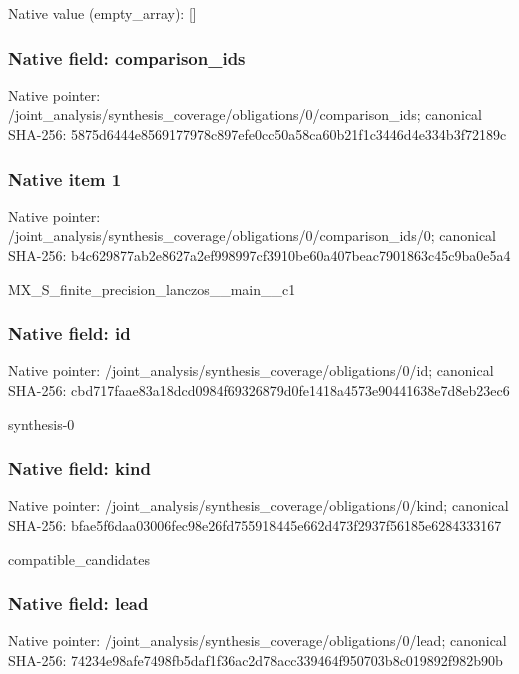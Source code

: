 \documentclass[10pt,a4paper]{article}
\begin{document}
Native value (empty\_\allowbreak{}array): []

\subsubsection{Native field: comparison\_\allowbreak{}ids}
Native pointer: /joint\_\allowbreak{}analysis/synthesis\_\allowbreak{}coverage/obligations/0/comparison\_\allowbreak{}ids; canonical SHA-256: 5875d6444e8569177978c897efe0cc50a58ca60b21f1c3446d4e334b3f72189c

\subsubsection{Native item 1}
Native pointer: /joint\_\allowbreak{}analysis/synthesis\_\allowbreak{}coverage/obligations/0/comparison\_\allowbreak{}ids/0; canonical SHA-256: b4c629877ab2e8627a2ef998997cf3910be60a407beac7901863c45c9ba0e5a4

\begingroup\raggedright\sloppy MX\_\allowbreak{}S\_\allowbreak{}finite\_\allowbreak{}precision\_\allowbreak{}lanczos\_\allowbreak{}\_\allowbreak{}main\_\allowbreak{}\_\allowbreak{}c1\par\endgroup

\subsubsection{Native field: id}
Native pointer: /joint\_\allowbreak{}analysis/synthesis\_\allowbreak{}coverage/obligations/0/id; canonical SHA-256: cbd717faae83a18dcd0984f69326879d0fe1418a4573e90441638e7d8eb23ec6

\begingroup\raggedright\sloppy synthesis-0\par\endgroup

\subsubsection{Native field: kind}
Native pointer: /joint\_\allowbreak{}analysis/synthesis\_\allowbreak{}coverage/obligations/0/kind; canonical SHA-256: bfae5f6daa03006fec98e26fd755918445e662d473f2937f56185e6284333167

\begingroup\raggedright\sloppy compatible\_\allowbreak{}candidates\par\endgroup

\subsubsection{Native field: lead}
Native pointer: /joint\_\allowbreak{}analysis/synthesis\_\allowbreak{}coverage/obligations/0/lead; canonical SHA-256: 74234e98afe7498fb5daf1f36ac2d78acc339464f950703b8c019892f982b90b
\end{document}

